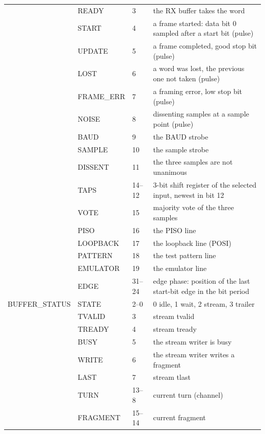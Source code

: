 \documentclass[12pt]{article}
\begin{document}
\begin{table}[htbp]
\begin{center}
\begin{tabularx}{\textwidth}{lllL}
               & READY   & 3      & the RX buffer takes the word \\
               & START   & 4      & a frame started:  data bit 0 sampled after a start bit (pulse) \\
               & UPDATE  & 5      & a frame completed, good stop bit (pulse) \\
               & LOST    & 6      & a word was lost, the previous one not taken (pulse) \\
               & FRAME\_ERR & 7   & a framing error, low stop bit (pulse) \\
               & NOISE   & 8      & dissenting samples at a sample point (pulse) \\
               & BAUD    & 9      & the BAUD strobe \\
               & SAMPLE  & 10     & the sample strobe \\
               & DISSENT & 11     & the three samples are not unanimous \\
               & TAPS    & 14--12 & 3-bit shift register of the selected input, newest in bit 12 \\
               & VOTE    & 15     & majority vote of the three samples \\
               & PISO    & 16     & the PISO line \\
               & LOOPBACK & 17    & the loopback line (POSI) \\
               & PATTERN & 18     & the test pattern line \\
               & EMULATOR & 19    & the emulator line \\
               & EDGE    & 31--24 & edge phase:  position of the last start-bit edge in the bit period \\
\midrule
BUFFER\_STATUS & STATE   & 2--0   & 0 idle, 1 wait, 2 stream, 3 trailer \\
               & TVALID  & 3      & stream tvalid \\
               & TREADY  & 4      & stream tready \\
               & BUSY    & 5      & the stream writer is busy \\
               & WRITE   & 6      & the stream writer writes a fragment \\
               & LAST    & 7      & stream tlast \\
               & TURN    & 13--8  & current turn (channel) \\
               & FRAGMENT & 15--14 & current fragment \\
\bottomrule
\end{tabularx}
\end{center}
\end{table}
\end{document}
